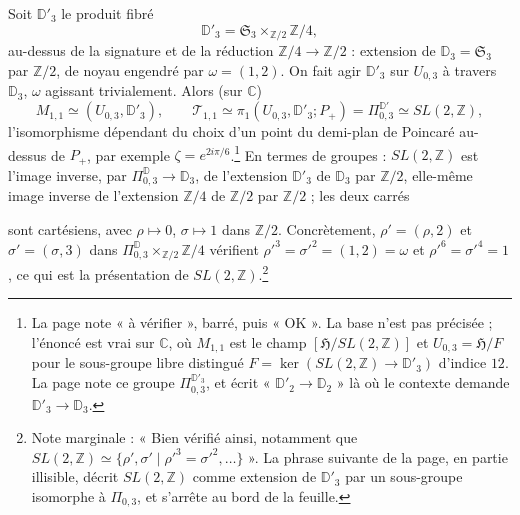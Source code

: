 \documentclass[11pt,a4paper]{article}
\begin{document}
Soit $\mathbb{D}'_3$ le produit fibré
\[
\mathbb{D}'_3 = \mathfrak{S}_3 \times_{\mathbb{Z}/2} \mathbb{Z}/4 ,
\]
au-dessus de la signature et de la réduction $\mathbb{Z}/4 \to \mathbb{Z}/2$ :
extension de $\mathbb{D}_3 = \mathfrak{S}_3$ par $\mathbb{Z}/2$, de noyau engendré
par $\omega = (1, 2)$. On fait agir $\mathbb{D}'_3$ sur $U_{0,3}$ à travers
$\mathbb{D}_3$, $\omega$ agissant trivialement. Alors (sur $\mathbb{C}$)
\[
M_{1,1} \simeq (U_{0,3}, \mathbb{D}'_3), \qquad
\mathcal{T}_{1,1} \simeq \pi_1(U_{0,3}, \mathbb{D}'_3; P_+) =
\Pi^{\mathbb{D}'}_{0,3} \simeq SL(2, \mathbb{Z}) ,
\]
l'isomorphisme dépendant du choix d'un point du demi-plan de Poincaré au-dessus
de $P_+$, par exemple $\zeta = e^{2i\pi/6}$.\footnote{La page note « à vérifier »,
barré, puis « OK ». La base n'est pas précisée ; l'énoncé est vrai sur
$\mathbb{C}$, où $M_{1,1}$ est le champ $[\mathfrak{H}/SL(2, \mathbb{Z})]$ et
$U_{0,3} = \mathfrak{H}/F$ pour le sous-groupe libre distingué $F = \ker(SL(2,
\mathbb{Z}) \to \mathbb{D}'_3)$ d'indice $12$. La page note ce groupe
$\Pi^{\mathbb{D}'_3}_{0,3}$, et écrit « $\mathbb{D}'_2 \to \mathbb{D}_2$ » là où le
contexte demande $\mathbb{D}'_3 \to \mathbb{D}_3$.} En termes de groupes :
$SL(2, \mathbb{Z})$ est l'image inverse, par $\Pi^{\mathbb{D}}_{0,3} \to
\mathbb{D}_3$, de l'extension $\mathbb{D}'_3$ de $\mathbb{D}_3$ par $\mathbb{Z}/2$,
elle-même image inverse de l'extension $\mathbb{Z}/4$ de $\mathbb{Z}/2$ par
$\mathbb{Z}/2$ ; les deux carrés


sont cartésiens, avec $\rho \mapsto 0$, $\sigma \mapsto 1$ dans $\mathbb{Z}/2$.
Concrètement, $\rho' = (\rho, 2)$ et $\sigma' = (\sigma, 3)$ dans
$\Pi^{\mathbb{D}}_{0,3} \times_{\mathbb{Z}/2} \mathbb{Z}/4$ vérifient
$\rho'^3 = \sigma'^2 = (1, 2) = \omega$ et $\rho'^6 = \sigma'^4 = 1$, ce qui est la
présentation de $SL(2, \mathbb{Z})$.\footnote{Note marginale : « Bien vérifié
ainsi, notamment que $SL(2, \mathbb{Z}) \simeq \{\rho', \sigma' \mid \rho'^3 =
\sigma'^2, \ldots\}$ ». La phrase suivante de la page, en partie illisible,
décrit $SL(2, \mathbb{Z})$ comme extension de $\mathbb{D}'_3$ par un sous-groupe
isomorphe à $\Pi_{0,3}$, et s'arrête au bord de la feuille.}
\end{document}
